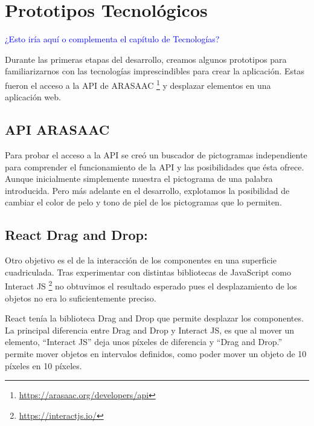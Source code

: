 \section{Prototipos Tecnológicos}
\textcolor{blue}{¿Esto iría aquí o complementa el capítulo de Tecnologías?}

Durante las primeras etapas del desarrollo, creamos algunos prototipos para familiarizarnos con las tecnologías imprescindibles para crear la aplicación. Estas fueron el acceso a la API de ARASAAC \footnote{\url{https://arasaac.org/developers/api}} y desplazar elementos en una aplicación web.

\subsection{API ARASAAC}

Para probar el acceso a la API se creó un buscador de pictogramas independiente para comprender el funcionamiento de la API y las posibilidades que ésta ofrece. Aunque inicialmente simplemente muestra el pictograma de una palabra introducida. Pero más adelante en el desarrollo, explotamos la posibilidad de cambiar el color de pelo y tono de piel de los pictogramas que lo permiten.


\subsection{React Drag and Drop:}

Otro objetivo es el de la interacción de los componentes en una superficie cuadriculada. Tras experimentar con distintas bibliotecas de JavaScript como Interact JS \footnote{\url{https://interactjs.io/}} no obtuvimos el resultado esperado pues el desplazamiento de los objetos no era lo suficientemente preciso.

React tenía la biblioteca Drag and Drop que permite desplazar los componentes. La principal diferencia entre Drag and Drop y Interact JS, es que al mover un elemento, “Interact JS”  deja unos píxeles de diferencia y “Drag and Drop.” permite mover objetos en intervalos definidos, como poder mover un objeto de 10 píxeles en 10 píxeles.




